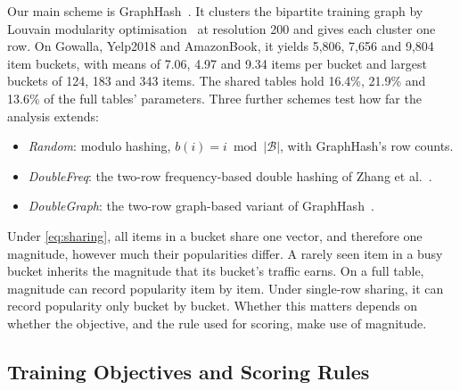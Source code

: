 Our main scheme is GraphHash~\cite{wu2025graphhash}. It clusters the bipartite training graph by Louvain modularity optimisation~\cite{blondel2008louvain} at resolution 200 and gives each cluster one row. On Gowalla, Yelp2018 and AmazonBook, it yields 5{,}806, 7{,}656 and 9{,}804 item buckets, with means of 7.06, 4.97 and 9.34 items per bucket and largest buckets of 124, 183 and 343 items. The shared tables hold 16.4\%, 21.9\% and 13.6\% of the full tables' parameters. Three further schemes test how far the analysis extends:
\begin{itemize}
\item \emph{Random}: modulo hashing, $b(i)=i\bmod|\mathcal{B}|$, with GraphHash's row counts.
\item \emph{DoubleFreq}: the two-row frequency-based double hashing of Zhang et al.~\cite{zhang2020doublehash}.
\item \emph{DoubleGraph}: the two-row graph-based variant of GraphHash~\cite{wu2025graphhash}.
\end{itemize}

Under \eqref{eq:sharing}, all items in a bucket share one vector, and therefore one magnitude, however much their popularities differ. A rarely seen item in a busy bucket inherits the magnitude that its bucket's traffic earns. On a full table, magnitude can record popularity item by item. Under single-row sharing, it can record popularity only bucket by bucket. Whether this matters depends on whether the objective, and the rule used for scoring, make use of magnitude.

\subsection{Training Objectives and Scoring Rules}\label{sec:prelim-scoring}

